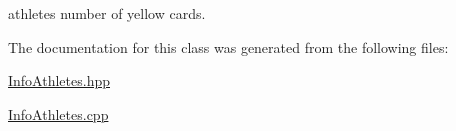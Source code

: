 athlete\textquotesingle{}s number of yellow cards. 



The documentation for this class was generated from the following files\+:\begin{DoxyCompactItemize}
\item 
\hyperlink{_info_athletes_8hpp}{Info\+Athletes.\+hpp}\item 
\hyperlink{_info_athletes_8cpp}{Info\+Athletes.\+cpp}\end{DoxyCompactItemize}
